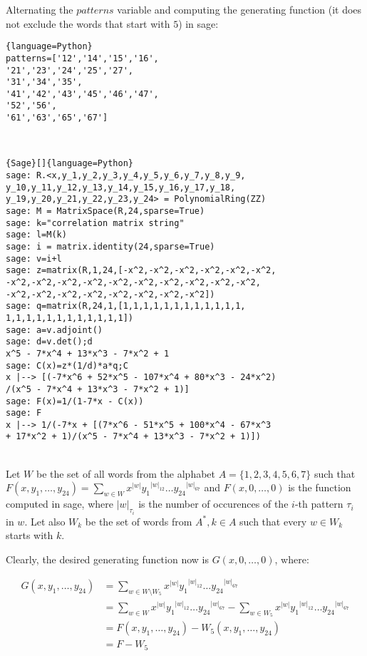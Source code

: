 \documentclass[12pt]{report}
\begin{document}
{{\noindent Alternating the $patterns$ variable and computing the generating function (it does not exclude the words that start with $5$) in sage:
{
\begin{lstlisting}{language=Python}
patterns=['12','14','15','16',
'21','23','24','25','27',
'31','34','35',
'41','42','43','45','46','47',
'52','56',
'61','63','65','67']
\end{lstlisting}} \quad \\
{
\begin{lstlisting}{Sage}[]{language=Python}
sage: R.<x,y_1,y_2,y_3,y_4,y_5,y_6,y_7,y_8,y_9,
y_10,y_11,y_12,y_13,y_14,y_15,y_16,y_17,y_18,
y_19,y_20,y_21,y_22,y_23,y_24> = PolynomialRing(ZZ)
sage: M = MatrixSpace(R,24,sparse=True)
sage: k="correlation matrix string"
sage: l=M(k)
sage: i = matrix.identity(24,sparse=True)
sage: v=i+l
sage: z=matrix(R,1,24,[-x^2,-x^2,-x^2,-x^2,-x^2,-x^2,
-x^2,-x^2,-x^2,-x^2,-x^2,-x^2,-x^2,-x^2,-x^2,-x^2,
-x^2,-x^2,-x^2,-x^2,-x^2,-x^2,-x^2,-x^2])
sage: q=matrix(R,24,1,[1,1,1,1,1,1,1,1,1,1,1,1,
1,1,1,1,1,1,1,1,1,1,1,1])
sage: a=v.adjoint()
sage: d=v.det();d
x^5 - 7*x^4 + 13*x^3 - 7*x^2 + 1
sage: C(x)=z*(1/d)*a*q;C
x |--> [(-7*x^6 + 52*x^5 - 107*x^4 + 80*x^3 - 24*x^2)
/(x^5 - 7*x^4 + 13*x^3 - 7*x^2 + 1)]
sage: F(x)=1/(1-7*x - C(x))
sage: F
x |--> 1/(-7*x + [(7*x^6 - 51*x^5 + 100*x^4 - 67*x^3 
+ 17*x^2 + 1)/(x^5 - 7*x^4 + 13*x^3 - 7*x^2 + 1)])
\end{lstlisting}} \quad \\

\noindent Let $W$ be the set of all words from the alphabet $A=\{1,2,3,4,5,6,7\}$ such that $F(x,y_1,\ldots,y_{24})=\sum\limits_{w \in W } x^{|w|} {y_1}^{|w|_{12}} \ldots {y_{24}}^{|w|_{67}}$ and $F(x,0,\ldots,0)$ is the function computed in sage, where $|w|_{\tau_i}$ is the number of occurences of the $i$-th pattern $\tau_i$ in $w$. Let also $W_k$ be the set of words from $A^*, k \in A$ such that every $w \in W_k$ starts with $k$.

\noindent Clearly, the desired generating function now is $G(x,0,\ldots,0)$, where:

\begin{align*}
G(x,y_1,\ldots,y_{24}) &= \sum\limits_{w \in W \setminus W_5}x^{|w|} {y_1}^{|w|_{12}} \ldots {y_{24}}^{|w|_{67}} \\ 
&= \sum\limits_{w \in W}x^{|w|} {y_1}^{|w|_{12}} \ldots {y_{24}}^{|w|_{67}} - \sum\limits_{w \in W_5}x^{|w|} {y_1}^{|w|_{12}} \ldots {y_{24}}^{|w|_{67}} \\
&= F(x,y_1,\ldots,y_{24}) - W_5(x,y_1,\ldots,y_{24}) \\
&= F - W_5
\end{align*}

}}
\end{document}

